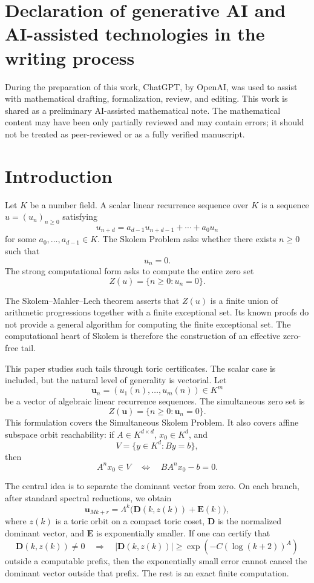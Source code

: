 \documentclass[11pt]{article}
\begin{document}
\section*{Declaration of generative AI and AI-assisted technologies in the writing process}
During the preparation of this work, ChatGPT, by OpenAI, was used to assist with mathematical drafting, formalization, review, and editing. This work is shared as a preliminary AI-assisted mathematical note. The mathematical content may have been only partially reviewed and may contain errors; it should not be treated as peer-reviewed or as a fully verified manuscript.

\section{Introduction}

Let \(K\) be a number field. A scalar linear recurrence sequence over \(K\) is a sequence \(u=(u_n)_{n\ge0}\) satisfying
\[
u_{n+d}=a_{d-1}u_{n+d-1}+\cdots+a_0u_n
\]
for some \(a_0,\ldots,a_{d-1}\in K\). The Skolem Problem asks whether there exists \(n\ge0\) such that
\[
u_n=0.
\]
The strong computational form asks to compute the entire zero set
\[
Z(u)=\{n\ge0:u_n=0\}.
\]

The Skolem--Mahler--Lech theorem asserts that \(Z(u)\) is a finite union of arithmetic progressions together with a finite exceptional set. Its known proofs do not provide a general algorithm for computing the finite exceptional set. The computational heart of Skolem is therefore the construction of an effective zero-free tail.

This paper studies such tails through toric certificates. The scalar case is included, but the natural level of generality is vectorial. Let
\[
\mathbf u_n=(u_1(n),\ldots,u_m(n))\in K^m
\]
be a vector of algebraic linear recurrence sequences. The simultaneous zero set is
\[
Z(\mathbf u)=\{n\ge0:\mathbf u_n=0\}.
\]
This formulation covers the Simultaneous Skolem Problem. It also covers affine subspace orbit reachability: if \(A\in K^{d\times d}\), \(x_0\in K^d\), and
\[
V=\{y\in K^d:By=b\},
\]
then
\[
A^n x_0\in V
\quad\Longleftrightarrow\quad
BA^n x_0-b=0.
\]

The central idea is to separate the dominant vector from zero. On each branch, after standard spectral reductions, we obtain
\[
\mathbf u_{Mk+r}
=
\Lambda^k\bigl(\mathbf D(k,z(k))+\mathbf E(k)\bigr),
\]
where \(z(k)\) is a toric orbit on a compact toric coset, \(\mathbf D\) is the normalized dominant vector, and \(\mathbf E\) is exponentially smaller. If one can certify that
\[
\mathbf D(k,z(k))\ne0
\quad\Longrightarrow\quad
|\mathbf D(k,z(k))|
\ge
\exp(-C(\log(k+2))^A)
\]
outside a computable prefix, then the exponentially small error cannot cancel the dominant vector outside that prefix. The rest is an exact finite computation.
\end{document}
